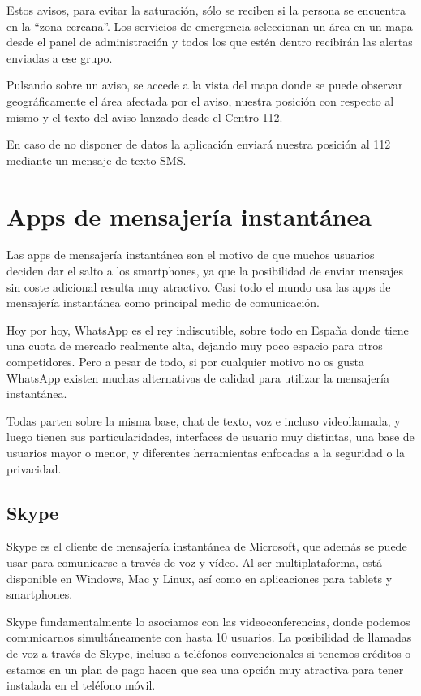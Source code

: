 Estos avisos, para evitar la saturación, sólo se reciben si la persona se encuentra en la “zona cercana”. Los servicios de emergencia seleccionan un área en un mapa desde el panel de administración y todos los que estén dentro recibirán las alertas enviadas a ese grupo.

Pulsando sobre un aviso, se accede a la vista del mapa donde se puede observar geográficamente el área afectada por el aviso, nuestra posición con respecto al mismo y el texto del aviso lanzado desde el Centro 112.

En caso de no disponer de datos la aplicación enviará nuestra posición al 112 mediante un mensaje de texto SMS.

\section{Apps de mensajería instantánea}

Las apps de mensajería instantánea son el motivo de que muchos usuarios deciden dar el salto a los smartphones, ya que la posibilidad de enviar mensajes sin coste adicional resulta muy atractivo. Casi todo el mundo usa las apps de mensajería instantánea como principal medio de comunicación.

Hoy por hoy, WhatsApp es el rey indiscutible, sobre todo en España donde tiene una cuota de mercado realmente alta, dejando muy poco espacio para otros competidores. Pero a pesar de todo, si por cualquier motivo no os gusta WhatsApp existen muchas alternativas de calidad para utilizar la mensajería instantánea.

Todas parten sobre la misma base, chat de texto, voz e incluso videollamada, y luego tienen sus particularidades, interfaces de usuario muy distintas, una base de usuarios mayor o menor, y diferentes herramientas enfocadas a la seguridad o la privacidad.

\subsection{Skype}

Skype es el cliente de mensajería instantánea de Microsoft, que además se puede usar para comunicarse a través de voz y vídeo. Al ser multiplataforma, está disponible en Windows, Mac y Linux, así como en aplicaciones para tablets y smartphones.

Skype fundamentalmente lo asociamos con las videoconferencias, donde podemos comunicarnos simultáneamente con hasta 10 usuarios.  La posibilidad de llamadas de voz a través de Skype, incluso a teléfonos convencionales si tenemos créditos o estamos en un plan de pago hacen que sea una opción muy atractiva para tener instalada en el teléfono móvil.

